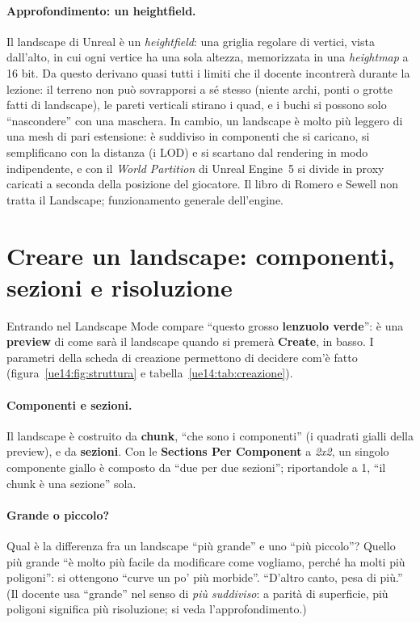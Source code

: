 \paragraph{Approfondimento: un heightfield.} Il landscape di Unreal è un
\emph{heightfield}: una griglia regolare di vertici, vista dall'alto, in cui ogni vertice
ha una sola altezza, memorizzata in una \emph{heightmap} a 16 bit. Da questo derivano quasi
tutti i limiti che il docente incontrerà durante la lezione: il terreno non può
sovrapporsi a sé stesso (niente archi, ponti o grotte fatti di landscape), le pareti
verticali stirano i quad, e i buchi si possono solo ``nascondere'' con una maschera. In
cambio, un landscape è molto più leggero di una mesh di pari estensione: è suddiviso in
componenti che si caricano, si semplificano con la distanza (i LOD) e si scartano dal
rendering in modo indipendente, e con il \emph{World Partition} di Unreal Engine~5 si
divide in proxy caricati a seconda della posizione del giocatore. Il libro di Romero e
Sewell non tratta il Landscape; funzionamento generale dell'engine.

\section{Creare un landscape: componenti, sezioni e risoluzione}
\label{ue14:sec:creazione}

Entrando nel Landscape Mode compare ``questo grosso \textbf{lenzuolo verde}'': è una
\textbf{preview} di come sarà il landscape quando si premerà \textbf{Create}, in basso. I
parametri della scheda di creazione permettono di decidere com'è fatto
(figura~\ref{ue14:fig:struttura} e tabella~\ref{ue14:tab:creazione}).

\paragraph{Componenti e sezioni.} Il landscape è costruito da \textbf{chunk}, ``che sono i
componenti'' (i quadrati gialli della preview), e da \textbf{sezioni}. Con le
\textbf{Sections Per Component} a \emph{2x2}, un singolo componente giallo è composto da
``due per due sezioni''; riportandole a 1, ``il chunk è una sezione'' sola.

\paragraph{Grande o piccolo?} Qual è la differenza fra un landscape ``più grande'' e uno
``più piccolo''? Quello più grande ``è molto più facile da modificare come vogliamo, perché
ha molti più poligoni'': si ottengono ``curve un po' più morbide''. ``D'altro canto, pesa di
più.'' (Il docente usa ``grande'' nel senso di \emph{più suddiviso}: a parità di superficie,
più poligoni significa più risoluzione; si veda l'approfondimento.)

